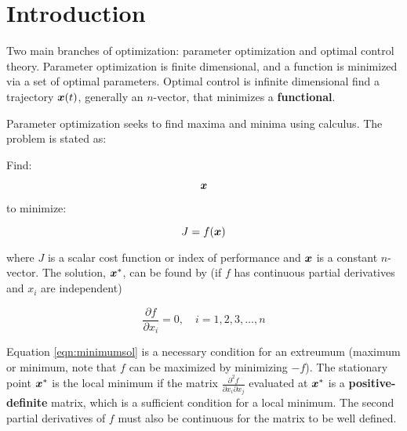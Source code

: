 \section{Introduction}

Two main branches of optimization: parameter optimization and optimal control theory. Parameter optimization is finite dimensional, and a function is minimized via a set of optimal parameters.  Optimal control is infinite dimensional find a trajectory $\boldsymbol{x}(t)$, generally an $n$-vector, that minimizes a \textbf{functional}.

Parameter optimization seeks to find maxima and minima using calculus. The problem is stated as:

\noindent Find:

$$
\boldsymbol{x}
$$

\noindent to minimize:

\begin{equation}
    J = f(\boldsymbol{x})
\end{equation}

\noindent where $J$ is a scalar cost function or index of performance and $\boldsymbol{x}$ is a constant $n$-vector. The solution, $\boldsymbol{x}^*$, can be found by (if $f$ has continuous partial derivatives and $x_i$ are independent)

\begin{equation} \label{eqn:minimumsol}
    \frac{\partial f}{\partial x_i} = 0, \quad i = 1,2,3,\dots,n
\end{equation}

Equation \ref{eqn:minimumsol} is a necessary condition for an extreumum (maximum or minimum, note that $f$ can be maximized by minimizing $-f$). The stationary point $\boldsymbol{x}^*$ is the local minimum if the matrix $\frac{\partial^2 f}{\partial x_i \partial x_j}$ evaluated at $\boldsymbol{x}^*$ is a \textbf{positive-definite}  matrix, which is a sufficient condition for a local minimum. The second partial derivatives of $f$ must also be continuous for the matrix to be well defined.




